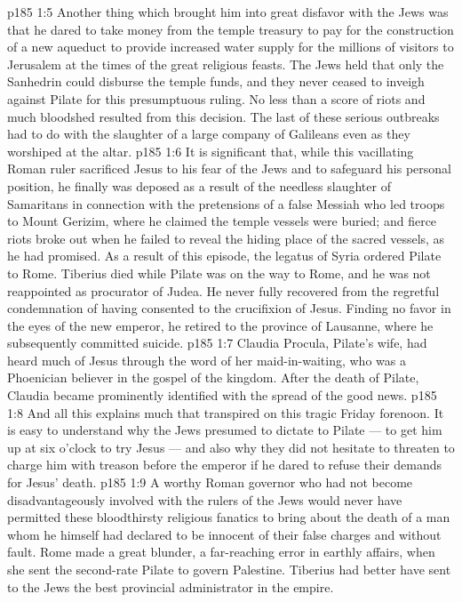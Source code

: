 \vs p185 1:5 \pc Another thing which brought him into great disfavor with the Jews was that he dared to take money from the temple treasury to pay for the construction of a new aqueduct to provide increased water supply for the millions of visitors to Jerusalem at the times of the great religious feasts. The Jews held that only the Sanhedrin could disburse the temple funds, and they never ceased to inveigh against Pilate for this presumptuous ruling. No less than a score of riots and much bloodshed resulted from this decision. The last of these serious outbreaks had to do with the slaughter of a large company of Galileans even as they worshiped at the altar.
\vs p185 1:6 \pc It is significant that, while this vacillating Roman ruler sacrificed Jesus to his fear of the Jews and to safeguard his personal position, he finally was deposed as a result of the needless slaughter of Samaritans in connection with the pretensions of a false Messiah who led troops to Mount Gerizim, where he claimed the temple vessels were buried; and fierce riots broke out when he failed to reveal the hiding place of the sacred vessels, as he had promised. As a result of this episode, the legatus of Syria ordered Pilate to Rome. Tiberius died while Pilate was on the way to Rome, and he was not reappointed as procurator of Judea. He never fully recovered from the regretful condemnation of having consented to the crucifixion of Jesus. Finding no favor in the eyes of the new emperor, he retired to the province of Lausanne, where he subsequently committed suicide.
\vs p185 1:7 \pc Claudia Procula, Pilate’s wife, had heard much of Jesus through the word of her maid\hyp{}in\hyp{}waiting, who was a Phoenician believer in the gospel of the kingdom. After the death of Pilate, Claudia became prominently identified with the spread of the good news.
\vs p185 1:8 \pc And all this explains much that transpired on this tragic Friday forenoon. It is easy to understand why the Jews presumed to dictate to Pilate --- to get him up at six o’clock to try Jesus --- and also why they did not hesitate to threaten to charge him with treason before the emperor if he dared to refuse their demands for Jesus’ death.
\vs p185 1:9 A worthy Roman governor who had not become disadvantageously involved with the rulers of the Jews would never have permitted these bloodthirsty religious fanatics to bring about the death of a man whom he himself had declared to be innocent of their false charges and without fault. Rome made a great blunder, a far\hyp{}reaching error in earthly affairs, when she sent the second\hyp{}rate Pilate to govern Palestine. Tiberius had better have sent to the Jews the best provincial administrator in the empire.
